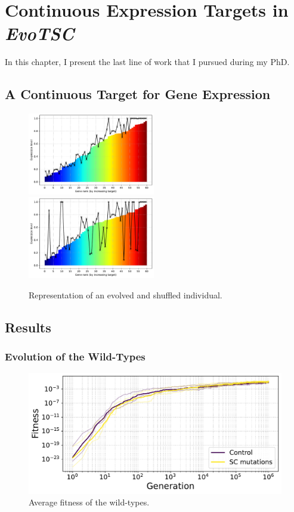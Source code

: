 \chapter{Continuous Expression Targets in \emph{EvoTSC}}
\label{chap:continuous}

In this chapter, I present the last line of work that I pursued during my PhD.

\section{A Continuous Target for Gene Expression}

\begin{figure}
\includegraphics[width=0.495\textwidth]{continuous/img/best_rep00.pdf}
\includegraphics[width=0.495\textwidth]{continuous/img/shuffled.pdf}
\caption{Representation of an evolved and shuffled individual.}
\label{fig:continuous:indiv}
\end{figure}

\section{Results}

\subsection{Evolution of the Wild-Types}

\begin{figure}
\includegraphics[width=\textwidth]{continuous/img/fitness_all_with_main.pdf}
\caption{Average fitness of the wild-types.}
\label{fig:continuous:wt-fitness}
\end{figure}

